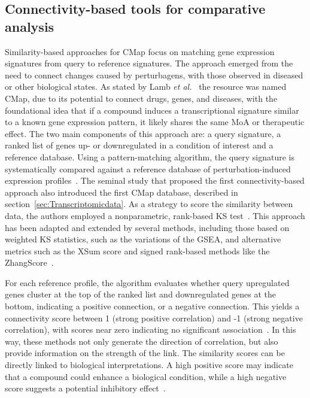 \subsection{Connectivity-based tools for comparative analysis} %
\label{sub:connectivity-basedmethods}

Similarity-based approaches for \gls{CMap} focus on matching gene expression signatures from query to reference signatures. 
The approach emerged from the need to connect changes caused by perturbagens, with those observed in diseased or other biological states.
As stated by Lamb \textit{et al.}~\cite{RN34} the resource was named \gls{CMap}, due to its potential to connect drugs, genes, and diseases, with the foundational idea that if a compound induces a transcriptional signature similar to a known gene expression pattern, it likely shares the same \gls{MoA} or therapeutic effect. 
The two main components of this approach are: a query signature, a ranked list of genes up- or downregulated in a condition of interest and a reference database.  
Using a pattern-matching algorithm, the query signature is systematically compared against a reference database of perturbation-induced expression profiles~\cite{RN155}. 
The seminal study that proposed the first connectivity-based approach also introduced the first \gls{CMap} database, described in section~\ref{sec:Transcriptomicdata}. 
As a strategy to score the similarity between data, the authors employed a nonparametric, rank-based \gls{KS} test~\cite{RN34, RN79}. 
This approach has been adapted and extended by several methods, including those based on weighted \gls{KS} statistics, such as the variations of the \gls{GSEA}, and alternative metrics such as the \gls{XSum} score and signed rank-based methods like the ZhangScore~\cite{RN79}. 

For each reference profile, the algorithm evaluates whether query upregulated genes cluster at the top of the ranked list and downregulated genes at the bottom, indicating a positive connection, or a negative connection. 
This yields a connectivity score between 1 (strong positive correlation) and -1 (strong negative correlation), with scores near zero indicating no significant association~\cite{RN34}. 
In this way, these methods not only generate the direction of correlation, but also provide information on the strength of the link. 
The similarity scores can be directly linked to biological interpretations. 
A high positive score may indicate that a compound could enhance a biological condition, while a high negative score suggests a potential inhibitory effect~\cite{RN102}. 

